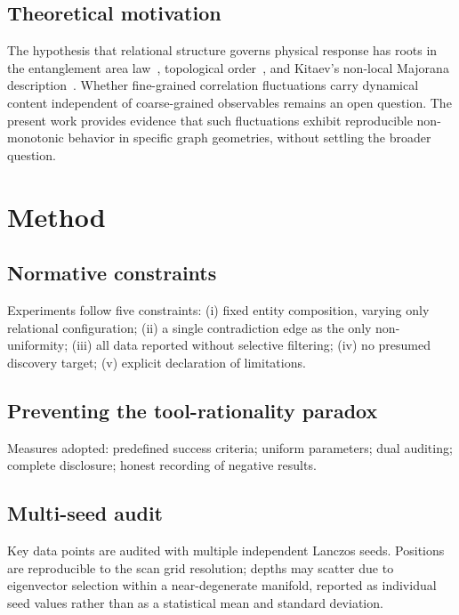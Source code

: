 \documentclass[aps,prb,reprint,superscriptaddress]{revtex4-2}
\begin{document}
\subsection{Theoretical motivation}

The hypothesis that relational structure governs physical response has roots in the entanglement area law~\cite{Eisert2010}, topological order~\cite{Wen2017}, and Kitaev's non-local Majorana description~\cite{Kitaev2001}. Whether fine-grained correlation fluctuations carry dynamical content independent of coarse-grained observables remains an open question. The present work provides evidence that such fluctuations exhibit reproducible non-monotonic behavior in specific graph geometries, without settling the broader question.

\section{Method}

\subsection{Normative constraints}

Experiments follow five constraints: (i) fixed entity composition, varying only relational configuration; (ii) a single contradiction edge as the only non-uniformity; (iii) all data reported without selective filtering; (iv) no presumed discovery target; (v) explicit declaration of limitations.

\subsection{Preventing the tool-rationality paradox}

Measures adopted: predefined success criteria; uniform parameters; dual auditing; complete disclosure; honest recording of negative results.

\subsection{Multi-seed audit}

Key data points are audited with multiple independent Lanczos seeds. Positions are reproducible to the scan grid resolution; depths may scatter due to eigenvector selection within a near-degenerate manifold, reported as individual seed values rather than as a statistical mean and standard deviation.
\end{document}
